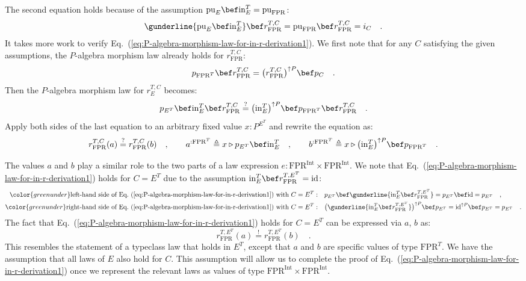 The second equation holds because of the assumption $\text{pu}_{E}\bef\text{in}_{E}^{T}=\text{pu}_{\text{FPR}}$:
\[
\gunderline{\text{pu}_{E}\bef\text{in}_{E}^{T}}\bef r_{\text{FPR}}^{T,C}=\text{pu}_{\text{FPR}}\bef r_{\text{FPR}}^{T,C}=i_{C}\quad.
\]
It takes more work to verify Eq.~(\ref{eq:P-algebra-morphism-law-for-in-r-derivation1}).
We first note that for any $C$ satisfying the given assumptions,
the $P$-algebra morphism law already holds for $r_{\text{FPR}}^{T,C}$:
\[
p_{\text{FPR}^{T}}\bef r_{\text{FPR}}^{T,C}=\big(r_{\text{FPR}}^{T,C}\big)^{\uparrow P}\bef p_{C}\quad.
\]
Then the $P$-algebra morphism law for $r_{E}^{T,C}$ becomes:
\[
p_{E^{T}}\bef\text{in}_{E}^{T}\bef r_{\text{FPR}}^{T,C}\overset{?}{=}\big(\text{in}_{E}^{T}\big)^{\uparrow P}\bef p_{\text{FPR}^{T}}\bef r_{\text{FPR}}^{T,C}\quad.
\]
Apply both sides of the last equation to an arbitrary fixed value
$x:P^{E^{T}}$ and rewrite the equation as: 
\[
r_{\text{FPR}}^{T,C}(a)\overset{?}{=}r_{\text{FPR}}^{T,C}(b)\quad,\quad\quad a^{:\text{FPR}^{T}}\triangleq x\triangleright p_{E^{T}}\bef\text{in}_{E}^{T}\quad,\quad\quad b^{:\text{FPR}^{T}}\triangleq x\triangleright\big(\text{in}_{E}^{T}\big)^{\uparrow P}\bef p_{\text{FPR}^{T}}\quad.
\]

The values $a$ and $b$ play a similar role to the two parts of a
law expression $e:\text{FPR}^{\text{Int}}\times\text{FPR}^{\text{Int}}$.
We note that Eq.~(\ref{eq:P-algebra-morphism-law-for-in-r-derivation1})
holds for $C=E^{T}$ due to the assumption $\text{in}_{E}^{T}\bef r_{\text{FPR}}^{T,E^{T}}=\text{id}$:
\begin{align*}
{\color{greenunder}\text{left-hand side of Eq.~(\ref{eq:P-algebra-morphism-law-for-in-r-derivation1}) with }C=E^{T}:}\quad & p_{E^{T}}\bef\gunderline{\text{in}_{E}^{T}\bef r_{\text{FPR}}^{T,E^{T}}}=p_{E^{T}}\bef\text{id}=p_{E^{T}}\quad,\\
{\color{greenunder}\text{right-hand side of Eq.~(\ref{eq:P-algebra-morphism-law-for-in-r-derivation1}) with }C=E^{T}:}\quad & \big(\gunderline{\text{in}_{E}^{T}\bef r_{\text{FPR}}^{T,E^{T}}}\big)^{\uparrow P}\bef p_{E^{T}}=\text{id}^{\uparrow P}\bef p_{E^{T}}=p_{E^{T}}\quad.
\end{align*}
The fact that Eq.~(\ref{eq:P-algebra-morphism-law-for-in-r-derivation1})
holds for $C=E^{T}$ can be expressed via $a$, $b$ as:
\[
r_{\text{FPR}}^{T,E^{T}}(a)\overset{!}{=}r_{\text{FPR}}^{T,E^{T}}(b)\quad.
\]
This resembles the statement of a typeclass law that holds in $E^{T}$,
except that $a$ and $b$ are specific values of type $\text{FPR}^{T}$.
We have the assumption that all laws of $E$ also hold for $C$. This
assumption will allow us to complete the proof of Eq.~(\ref{eq:P-algebra-morphism-law-for-in-r-derivation1})
once we represent the relevant laws as values of type $\text{FPR}^{\text{Int}}\times\text{FPR}^{\text{Int}}$.


